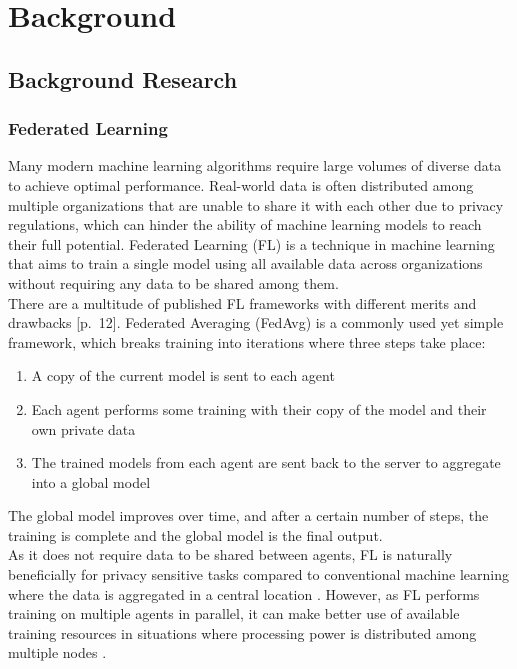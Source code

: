 \chapter{Background}
\section{Background Research}
\subsection{Federated Learning}
Many modern machine learning algorithms require large volumes of diverse data to achieve optimal performance. Real-world data is often distributed among multiple organizations that are unable to share it with each other due to privacy regulations, which can hinder the ability of machine learning models to reach their full potential. Federated Learning (FL) \cite{survey_on_fed_learning} is a technique in machine learning that aims to train a single model using all available data across organizations without requiring any data to be shared among them. \\

There are a multitude of published FL frameworks with different merits and drawbacks \cite{survey_on_fed_learning}[p.~12]. Federated Averaging (FedAvg) \cite{fed_learning} is a commonly used yet simple framework, which breaks training into iterations where three steps take place:
\begin{enumerate}
	\item A copy of the current model is sent to each agent
	\item Each agent performs some training with their copy of the model and their own private data
	\item The trained models from each agent are sent back to the server to aggregate into a global model
\end{enumerate}
The global model improves over time, and after a certain number of steps, the training is complete and the global model is the final output. \\

As it does not require data to be shared between agents, FL is naturally beneficially for privacy sensitive tasks compared to conventional machine learning where the data is aggregated in a central location \citeme. However, as FL performs training on multiple agents in parallel, it can make better use of available training resources in situations where processing power is distributed among multiple nodes \citeme. 

